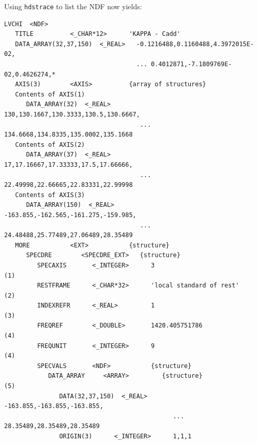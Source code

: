 Using {\tt hdstrace} to list the NDF now yields:

\small
\begin{verbatim}
LVCHI  <NDF>
   TITLE          <_CHAR*12>      'KAPPA - Cadd'
   DATA_ARRAY(32,37,150)  <_REAL>   -0.1216488,0.1160488,4.3972015E-02,
                                    ... 0.4012871,-7.1809769E-02,0.4626274,*
   AXIS(3)        <AXIS>          {array of structures}
   Contents of AXIS(1)
      DATA_ARRAY(32)  <_REAL>        130,130.1667,130.3333,130.5,130.6667,
                                     ... 134.6668,134.8335,135.0002,135.1668
   Contents of AXIS(2)
      DATA_ARRAY(37)  <_REAL>        17,17.16667,17.33333,17.5,17.66666,
                                     ... 22.49998,22.66665,22.83331,22.99998
   Contents of AXIS(3)
      DATA_ARRAY(150)  <_REAL>       -163.855,-162.565,-161.275,-159.985,
                                     ... 24.48488,25.77489,27.06489,28.35489
   MORE           <EXT>           {structure}
      SPECDRE        <SPECDRE_EXT>   {structure}
         SPECAXIS       <_INTEGER>      3                                   (1)
         RESTFRAME      <_CHAR*32>      'local standard of rest'            (2)
         INDEXREFR      <_REAL>         1                                   (3)
         FREQREF        <_DOUBLE>       1420.405751786                      (4)
         FREQUNIT       <_INTEGER>      9                                   (4)
         SPECVALS       <NDF>           {structure}
            DATA_ARRAY     <ARRAY>         {structure}                      (5)
               DATA(32,37,150)  <_REAL>       -163.855,-163.855,-163.855,
                                              ... 28.35489,28.35489,28.35489
               ORIGIN(3)      <_INTEGER>      1,1,1
 

\end{verbatim}
